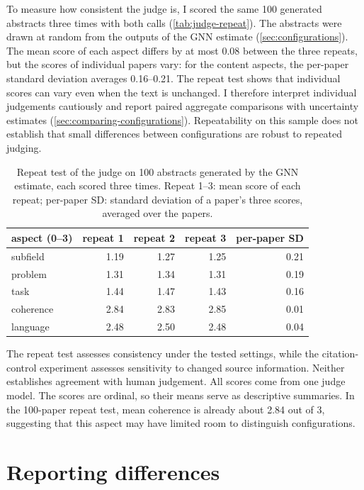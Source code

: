 To measure how consistent the judge is, I scored the same 100 generated abstracts three times with both calls (\autoref{tab:judge-repeat}). The abstracts were drawn at random from the outputs of the GNN estimate (\autoref{sec:configurations}). The mean score of each aspect differs by at most 0.08 between the three repeats, but the scores of individual papers vary: for the content aspects, the per-paper standard deviation averages 0.16--0.21. The repeat test shows that individual scores can vary even when the text is unchanged. I therefore interpret individual judgements cautiously and report paired aggregate comparisons with uncertainty estimates (\autoref{sec:comparing-configurations}). Repeatability on this sample does not establish that small differences between configurations are robust to repeated judging.

\begin{table}[!ht]
  \centering
  \begin{tabular}{@{}lrrrr@{}}
    \toprule
    aspect (0--3) & repeat 1 & repeat 2 & repeat 3 & per-paper SD \\
    \midrule
    subfield & 1.19 & 1.27 & 1.25 & 0.21 \\
    problem & 1.31 & 1.34 & 1.31 & 0.19 \\
    task & 1.44 & 1.47 & 1.43 & 0.16 \\
    coherence & 2.84 & 2.83 & 2.85 & 0.01 \\
    language & 2.48 & 2.50 & 2.48 & 0.04 \\
    \bottomrule
  \end{tabular}
  \caption{Repeat test of the judge on 100 abstracts generated by the GNN estimate, each scored three times. Repeat 1--3: mean score of each repeat; per-paper SD: standard deviation of a paper's three scores, averaged over the papers.}
  \label{tab:judge-repeat}
\end{table}

The repeat test assesses consistency under the tested settings, while the citation-control experiment assesses sensitivity to changed source information. Neither establishes agreement with human judgement. All scores come from one judge model. The scores are ordinal, so their means serve as descriptive summaries. In the 100-paper repeat test, mean coherence is already about 2.84 out of 3, suggesting that this aspect may have limited room to distinguish configurations.

\section{Reporting differences}
\label{sec:comparing-configurations}

